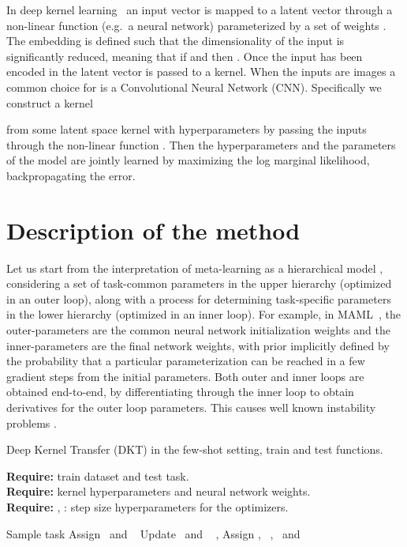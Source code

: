 \documentclass{article}
\begin{document}
In deep kernel learning~\citep{hinton2008using, wilson2016deep} an input vector  is mapped to a latent vector  through a non-linear function  (e.g.\ a neural network) parameterized by a set of weights . The embedding is defined such that the dimensionality of the input is significantly reduced, meaning that if  and  then . Once the input has been encoded in  the latent vector is passed to a kernel. When the inputs are images a common choice for  is a Convolutional Neural Network (CNN). Specifically we construct a kernel

from some latent space kernel  with hyperparameters  by passing the inputs through the non-linear function . Then the hyperparameters  and the parameters of the model  are jointly learned by maximizing the log marginal likelihood, backpropagating the error.


\section{Description of the method}
\label{sec:method}

Let us start from the interpretation of meta-learning as a hierarchical model \citep{finn2018probabilistic, grant2018recasting}, considering a set of task-common parameters in the upper hierarchy (optimized in an outer loop), along with a process for determining task-specific parameters in the lower hierarchy (optimized in an inner loop). For example, in MAML~\citep{finn2017model}, the outer-parameters are the common neural network initialization weights and the inner-parameters are the final network weights, with prior implicitly defined by the probability that a particular parameterization can be reached in a few gradient steps from the initial parameters. 
Both outer and inner loops are obtained end-to-end, by differentiating through the inner loop to obtain derivatives for the outer loop parameters. This causes well known instability problems \citep{antoniou2019train}.

\begin{algorithm}[H]
\small
\caption{Deep Kernel Transfer (DKT) in the few-shot setting, train and test functions.}
\label{alg_overview}
\textbf{Require:}   train dataset and  test task. \\
\textbf{Require:}   kernel hyperparameters and  neural network weights.  \\
\textbf{Require:}  , : step size hyperparameters for the optimizers.
\begin{algorithmic}[1]
\vspace{0.1cm} 
    \State Sample task 
        \State Assign  \ and \ 
        \State {}
        \State Update  \ and \ 
\EndWhile
\State \Return , 
\EndFunction
\vspace{0.1cm} 
        \State Assign , \ , \ and \ 
        \State \Return  {}
\EndFunction
\Statex
\end{algorithmic}
  \vspace{-0.2cm}\end{algorithm}
\end{document}
